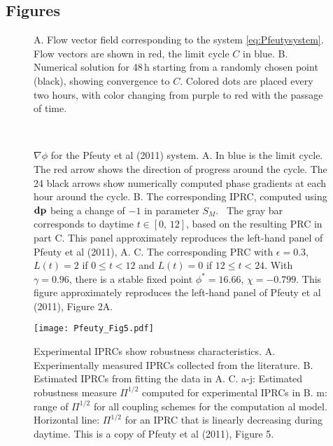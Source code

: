\clearpage
\vspace{-.5cm}
\subsection{Figures}
\renewcommand{\thesubfigure}{\Alph{subfigure}.}
\vspace{-.5cm}
\begin{figure}[h!]
\centering
{}
\caption{A. Flow vector field corresponding to the system
  \eqref{eq:Pfeutysystem}. Flow vectors are shown in red, the limit cycle $C$ in
  blue. 
  B. Numerical solution for 48\,h starting from a randomly chosen
  point (black), showing convergence to $C$. Colored dots are placed
  every two hours, with color changing from purple to red with the passage of time. }
\label{fig:LA1}%
\end{figure}

\begin{figure}[h!]
\centering
\begin{minipage}{.45\linewidth}
\end{minipage}~\begin{minipage}{.32\linewidth}
\end{minipage}
\caption{
$\nabla\phi$ for the Pfeuty et al (2011) system.
A. In blue is the limit cycle. The red arrow shows the direction of
progress around the cycle. The 24 black arrows show numerically
computed phase gradients at each hour around the cycle. B. The
corresponding IPRC, computed using $\vb{dp}$ being a change of 
$-1$ in parameter ${S}_{M}$. \ The gray bar corresponds to daytime 
$t{\in}[0,\,12]$, based on the resulting PRC in part C. This panel
approximately reproduces the left-hand panel of Pfeuty et al (2011),
A. C. The corresponding PRC with $\epsilon=0.3$, 
$L(t)=2$ if $0{\leq}t{<}12$ and $L(t)=0$ if $12{\leq}t{<}24$. 
With $\gamma =0.96$, there is a stable fixed point 
$\phi^{*}=16.66$, $\chi=-0.799$. This figure approximately reproduces the 
left-hand panel of Pfeuty et al (2011), Figure 2A.
}
\label{fig:LA2}
\end{figure}

\begin{figure}
\centerline{
\texttt{[image: Pfeuty\_Fig5.pdf]}
}\caption{Experimental IPRCs
show robustness characteristics.
A. Experimentally measured IPRCs collected from the literature. B.
Estimated IPRCs from fitting the data in A. C. a-j: Estimated
robustness measure $\varPi^{1/2}$ computed for experimental IPRCs in
B. m: range of $\varPi^{1/2}$ for all coupling schemes for the
computation al model. Horizontal line: $\varPi^{1/2}$ for an IPRC
that is linearly decreasing during daytime.
This is a copy of Pfeuty et al (2011), Figure 5.
}
\label{fig:Pfeuty5}
\end{figure}

\clearpage









